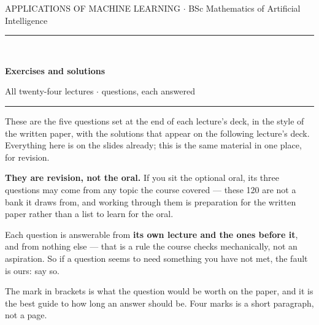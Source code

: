 \documentclass[11pt,a4paper]{article}
\begin{document}
\thispagestyle{empty}
\begin{flushleft}
  {\color{aimlmuted}\small\sffamily
   APPLICATIONS OF MACHINE LEARNING \quad$\cdot$\quad
   BSc Mathematics of Artificial Intelligence}\\[2mm]
  {\color{aimlrule}\rule{\textwidth}{0.8pt}}\\[4mm]
  {\Huge\bfseries\color{aimlprimary} Exercises and solutions\par}\vspace{3mm}
  {\color{aimlmuted}\large All twenty-four lectures \quad$\cdot$ questions, each answered}\\[3mm]
  {\color{aimlrule}\rule{\textwidth}{0.8pt}}
\end{flushleft}
\vspace{2mm}

\begin{keybox}[title={How to use this}]
These are the five questions set at the end of each lecture's deck, in the
style of the written paper, with the solutions that appear on the following
lecture's deck. Everything here is on the slides already; this is the same
material in one place, for revision.

\textbf{They are revision, not the oral.} If you sit the optional oral, its
three questions may come from any topic the course covered --- these 120 are
not a bank it draws from, and working through them is preparation for the
written paper rather than a list to learn for the oral.

Each question is answerable from \textbf{its own lecture and the ones before
it}, and from nothing else --- that is a rule the course checks mechanically,
not an aspiration. So if a question seems to need something you have not met,
the fault is ours: say so.

The mark in brackets is what the question would be worth on the paper, and it
is the best guide to how long an answer should be. Four marks is a short
paragraph, not a page.
\end{keybox}

\vspace{1mm}
{\small\tableofcontents}
\newpage
\end{document}
